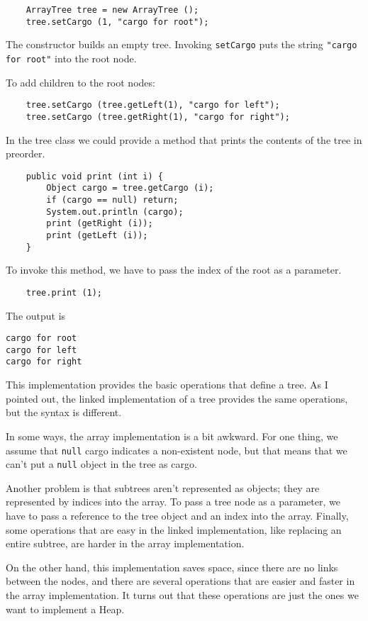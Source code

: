 \begin{verbatim}
    ArrayTree tree = new ArrayTree ();
    tree.setCargo (1, "cargo for root");
\end{verbatim}
%
The constructor builds an empty tree.
Invoking {\tt setCargo} puts the
string {\tt "cargo for root"} into the root node.

To add children to the root nodes:

\begin{verbatim}
    tree.setCargo (tree.getLeft(1), "cargo for left");
    tree.setCargo (tree.getRight(1), "cargo for right");
\end{verbatim}
%
In the tree class we could provide a method that prints
the contents of the tree in preorder.

\begin{verbatim}
    public void print (int i) {
        Object cargo = tree.getCargo (i);
        if (cargo == null) return;
        System.out.println (cargo);
        print (getRight (i));
        print (getLeft (i));
    }
\end{verbatim}
%
To invoke this method, we have to pass the index of
the root as a parameter.

\begin{verbatim}
    tree.print (1);
\end{verbatim}
%
The output is

\begin{verbatim}
cargo for root
cargo for left
cargo for right
\end{verbatim}
%
This implementation provides the basic operations that define a
tree.  As I pointed out, the linked implementation of a tree provides
the same operations, but the syntax is different.

In some ways, the array implementation is a bit awkward.  For
one thing, we assume that {\tt null} cargo indicates a non-existent
node, but that means that we can't put a {\tt null} object in the
tree as cargo.

Another problem is that subtrees aren't represented as objects;
they are represented by indices into the array.  To pass a tree
node as a parameter, we have to pass a reference to the tree
object and an index into the array.
Finally, some operations that are easy in the linked implementation,
like replacing an entire subtree, are harder in the array implementation.

On the other hand, this implementation saves space, since there are
no links between the nodes, and
there are several operations that are easier and faster
in the array implementation.  It turns out that these operations
are just the ones we want to implement a Heap.

